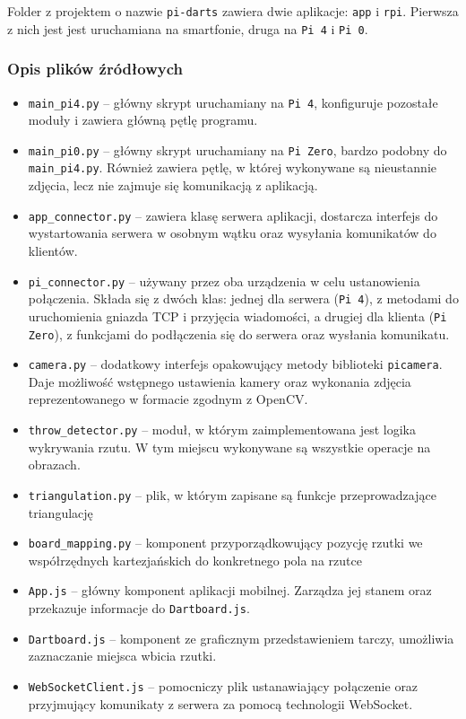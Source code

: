 Folder z projektem o nazwie \verb|pi-darts| zawiera dwie aplikacje: \verb|app| i \verb|rpi|. Pierwsza z nich jest jest uruchamiana na smartfonie, druga na \verb|Pi 4| i \verb|Pi 0|.

\subsubsection{Opis plików źródłowych}
\begin{itemize}
  \item \verb|main_pi4.py| -- główny skrypt uruchamiany na \verb|Pi 4|, konfiguruje pozostałe moduły i zawiera główną pętlę programu.
  \item \verb|main_pi0.py| -- główny skrypt uruchamiany na \verb|Pi Zero|, bardzo podobny do \verb|main_pi4.py|. Również zawiera pętlę, w której wykonywane są nieustannie zdjęcia, lecz nie zajmuje się komunikacją z aplikacją.
  \item \verb|app_connector.py| -- zawiera klasę serwera aplikacji, dostarcza interfejs do wystartowania serwera w osobnym wątku oraz wysyłania komunikatów do klientów.
  \item \verb|pi_connector.py| -- używany przez oba urządzenia w celu ustanowienia połączenia. Składa się z dwóch klas: jednej dla serwera (\verb|Pi 4|), z metodami do uruchomienia gniazda TCP i przyjęcia wiadomości, a drugiej dla klienta (\verb|Pi Zero|), z funkcjami do podłączenia się do serwera oraz wysłania komunikatu.
  \item \verb|camera.py| -- dodatkowy interfejs opakowujący metody biblioteki \verb|picamera|. Daje możliwość wstępnego ustawienia kamery oraz wykonania zdjęcia reprezentowanego w formacie zgodnym z OpenCV.
  \item \verb|throw_detector.py| -- moduł, w którym zaimplementowana jest logika wykrywania rzutu. W tym miejscu wykonywane są wszystkie operacje na obrazach.
  \item \verb|triangulation.py| -- plik, w którym zapisane są funkcje przeprowadzające triangulację
  \item \verb|board_mapping.py| -- komponent przyporządkowujący pozycję rzutki we współrzędnych kartezjańskich do konkretnego pola na rzutce
  \item \verb|App.js| -- główny komponent aplikacji mobilnej. Zarządza jej stanem oraz przekazuje informacje do \verb|Dartboard.js|.
  \item \verb|Dartboard.js| -- komponent ze graficznym przedstawieniem tarczy, umożliwia zaznaczanie miejsca wbicia rzutki.
  \item \verb|WebSocketClient.js| -- pomocniczy plik ustanawiający połączenie oraz przyjmujący komunikaty z serwera za pomocą technologii WebSocket.
  
\end{itemize}

